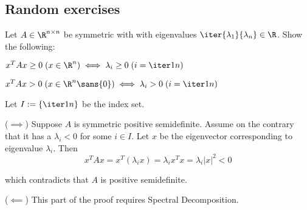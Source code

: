 \subsection{Random exercises}\label{f160236}

\label{f8a73df}

Let $A\in\R^{n\times n}$ be symmetric with with eigenvalues
$\iter{\lambda_1}{\lambda_n}\in\R$. Show the following:
\begin{enumerata}
  \item $x^TAx\geq0\;(x\in\R^n)\iff\lambda_i\geq0\;(i=\iter1n)$
  \item $x^TAx>0\;(x\in\R^n\sans{0})\iff\lambda_i>0\;(i=\iter1n)$
\end{enumerata}

\begin{compute}
  Let $I:=\{\iter1n\}$ be the index set.

  ($\implies$) Suppose $A$ is symmetric positive semidefinite. Assume on the
  contrary that it has a $\lambda_i<0$ for some $i\in I$. Let $x$ be the
  eigenvector corresponding to eigenvalue $\lambda_i$. Then
  $$
    x^TAx=x^T(\lambda_ix)=\lambda_ix^Tx=\lambda_i|x|^2<0
  $$

  which contradicts that $A$ is positive semidefinite.

  ($\impliedby$) This part of the proof requires Spectral Decomposition.
\end{compute}
